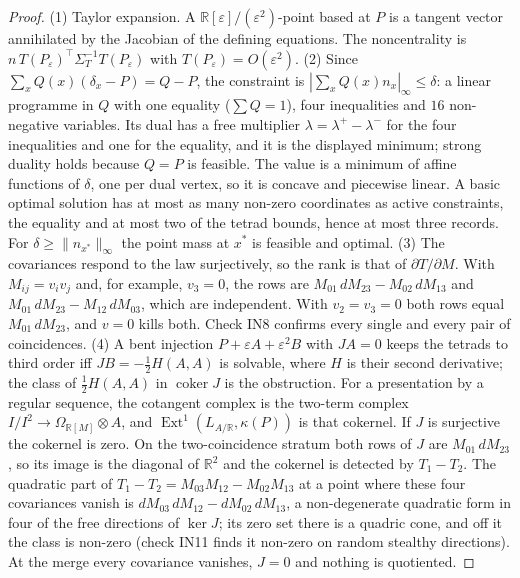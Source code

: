 \documentclass[11pt]{article}
\theoremstyle{definition}\newtheorem{definition}{Definition}\newtheorem{remark}{Remark}
\newcommand{\R}{\mathbb R}
\begin{document}
\begin{proof}
(1) Taylor expansion. A $\R[\varepsilon]/(\varepsilon^2)$-point based at $P$ is a tangent vector annihilated by the Jacobian of the
defining equations. The noncentrality is $n\,T(P_\varepsilon)^\top\Sigma_T^{-1}T(P_\varepsilon)$ with $T(P_\varepsilon)=O(\varepsilon^2)$.
(2) Since $\sum_xQ(x)(\delta_x-P)=Q-P$, the constraint is $|\sum_xQ(x)n_x|_\infty\le\delta$: a linear programme in $Q$ with one equality
($\sum Q=1$), four inequalities and $16$ non-negative variables. Its dual has a free multiplier $\lambda=\lambda^+-\lambda^-$ for the four
inequalities and one for the equality, and it is the displayed minimum; strong duality holds because $Q=P$ is feasible. The value is a
minimum of affine functions of $\delta$, one per dual vertex, so it is concave and piecewise linear. A basic optimal solution has at most
as many non-zero coordinates as active constraints, the equality and at most two of the tetrad bounds, hence at most three records. For
$\delta\ge\|n_{x^*}\|_\infty$ the point mass at $x^*$ is feasible and optimal. (3) The covariances respond to the law surjectively, so the rank is that of $\partial T/\partial M$. With $M_{ij}=v_iv_j$ and,
for example, $v_3=0$, the rows are $M_{01}\,dM_{23}-M_{02}\,dM_{13}$ and $M_{01}\,dM_{23}-M_{12}\,dM_{03}$, which are independent. With
$v_2=v_3=0$ both rows equal $M_{01}\,dM_{23}$, and $v=0$ kills both. Check IN8 confirms every single and every pair of coincidences.
(4) A bent injection $P+\varepsilon A+\varepsilon^2B$ with $JA=0$ keeps the tetrads to third order iff $JB=-\tfrac12H(A,A)$ is
solvable, where $H$ is their second derivative; the class of $\tfrac12H(A,A)$ in $\operatorname{coker}J$ is the obstruction. For a
presentation by a regular sequence, the cotangent complex is the two-term complex $I/I^2\to\Omega_{\R[M]}\otimes A$, and
$\operatorname{Ext}^1(L_{A/\R},\kappa(P))$ is that cokernel. If $J$ is surjective the cokernel is zero. On the two-coincidence stratum
both rows of $J$ are $M_{01}\,dM_{23}$, so its image is the diagonal of $\R^2$ and the cokernel is detected by $T_1-T_2$. The quadratic
part of $T_1-T_2=M_{03}M_{12}-M_{02}M_{13}$ at a point where these four covariances vanish is $dM_{03}\,dM_{12}-dM_{02}\,dM_{13}$, a
non-degenerate quadratic form in four of the free directions of $\ker J$; its zero set there is a quadric cone, and off it the class is
non-zero (check IN11 finds it non-zero on random stealthy directions). At the merge every covariance vanishes, $J=0$ and nothing is
quotiented.
\end{proof}
\end{document}
